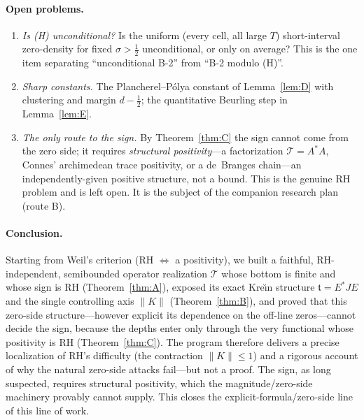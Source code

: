 \documentclass[11pt]{amsart}
\theoremstyle{definition}
\theoremstyle{remark}
\newcommand{\half}{\tfrac12}
\newcommand{\tform}{\mathfrak t}
\newcommand{\Top}{\mathcal T}
\newcommand{\Kop}{K}
\newcommand{\Norm}[1]{\lVert #1 \rVert}
\begin{document}
\paragraph{Open problems.}
\begin{enumerate}[label=\textbf{\arabic*.}]
\item \emph{Is (H) unconditional?} Is the uniform (every cell, all large $T$)
short-interval zero-density for fixed $\sigma>\half$ unconditional, or only on average?
This is the one item separating ``unconditional B-2'' from ``B-2 modulo (H)''.
\item \emph{Sharp constants.} The Plancherel--P\'olya constant of Lemma~\ref{lem:D} with
clustering and margin $d-\half$; the quantitative Beurling step in Lemma~\ref{lem:E}.
\item \emph{The only route to the sign.} By Theorem~\ref{thm:C} the sign cannot come from
the zero side; it requires \emph{structural positivity}---a factorization $\Top=A^{*}A$,
Connes' archimedean trace positivity, or a de~Branges chain---an independently-given
positive structure, not a bound. This is the genuine RH problem and is left open. It is
the subject of the companion research plan (route B).
\end{enumerate}

\paragraph{Conclusion.} Starting from Weil's criterion (RH $\iff$ a positivity), we built
a faithful, RH-independent, semibounded operator realization $\Top$ whose bottom is
finite and whose sign is RH (Theorem~\ref{thm:A}), exposed its exact Kre\u{\i}n structure
$\tform=E^{*}JE$ and the single controlling axis $\Norm{\Kop}$ (Theorem~\ref{thm:B}), and
proved that this zero-side structure---however explicit its dependence on the off-line
zeros---cannot decide the sign, because the depths enter only through the very functional
whose positivity is RH (Theorem~\ref{thm:C}). The program therefore delivers a precise
localization of RH's difficulty (the contraction $\Norm{\Kop}\le1$) and a rigorous
account of why the natural zero-side attacks fail---but not a proof. The sign, as long
suspected, requires structural positivity, which the magnitude/zero-side machinery
provably cannot supply. This closes the explicit-formula/zero-side line of this line of work.
\end{document}
